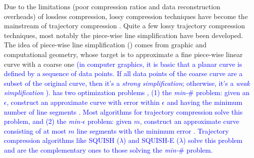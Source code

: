 Due to the  limitations (poor compression ratios and data reconstruction overheads) of lossless compression, lossy compression techniques have become the mainstream of trajectory compression \cite{Lin:Operb,Zhang:Evaluation}. Quite a few lossy trajectory compression techniques, most notably the piece-wise line simplification \cite{Keogh:online,Liu:BQS, Muckell:Compression, Chen:Trajectory, Chen:Fast, Cao:Spatio,Shi:Survey,Cao:Dots,Chen:Compression,Ghica:DTracking,Ke:Interval,Lange:Tracking,Lin:Cised,Lin:Operb,Liu:Amnesic,Long:Direction,Meratnia:Spatiotemporal,Muckell:SQUISH,Trajcevski:DDR,Wu:Graph} have been developed.
%
The idea of piece-wise line simplification (\lsa) comes from graphic and computational geometry, whose target is to approximate a fine piece-wise linear curve with a coarse one \textcolor{blue}{(in computer graphics, it is basic that a planar curve is defined by a sequence of data points\cite{Williams:Bounded}. If all data points of the coarse curve are a subset of the original curve, then it's a \emph{strong simplification}; otherwise, it's a \emph{weak simplification} \cite{Trajcevski:DDR}). \lsa has two optimization problems \cite{Chan:Optimal, Imai:Optimal,Pavlidis:Segment}, (1) the \emph{min-$\#$} problem: given an $\epsilon$, construct an approximate curve with error within $\epsilon$ and having the minimum number of line segments \cite{Chan:Optimal, Imai:Optimal}. Most \lsa algorithms for trajectory compression \cite{Douglas:Peucker, Hershberger:Speeding, Keogh:online,Liu:BQS, Muckell:Compression, Chen:Trajectory, Chen:Fast, Cao:Spatio,Cao:Dots,Chen:Compression,Ghica:DTracking,Ke:Interval,Lange:Tracking,Lin:Cised,Lin:Operb,Liu:Amnesic,Long:Direction,Meratnia:Spatiotemporal,Trajcevski:DDR,Wu:Graph} solve this problem, and}
\textcolor{blue}{(2) the \emph{min-$\epsilon$} problem: given $m$, construct an approximate curve consisting of at most $m$ line segments with the minimum error \cite{Chan:Optimal, Imai:Optimal}. Trajectory compression algorithms like SQUISH ($\lambda$) \cite{Muckell:SQUISH} and SQUISH-E ($\lambda$) \cite{Muckell:Compression} solve this problem and are the complementary ones to those solving the \emph{min-$\#$} problem.}
